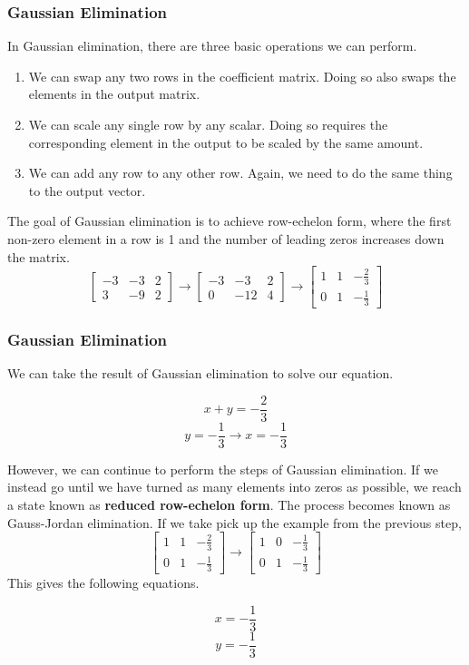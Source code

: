 \documentclass[10pt]{beamer}
\begin{document}
\begin{frame}
  \frametitle{Gaussian Elimination}
  In Gaussian elimination, there are three basic operations we can perform.
  \begin{enumerate}
  \item We can swap any two rows in the coefficient matrix. Doing so also swaps the elements in the output matrix.
  \item We can scale any single row by any scalar. Doing so requires the corresponding element in the output to be scaled by the same amount.
  \item We can add any row to any other row. Again, we need to do the same thing to the output vector.
  \end{enumerate}

  The goal of Gaussian elimination is to achieve row-echelon form, where the first non-zero element in a row is 1 and the number of leading zeros increases down the matrix.
  $$\left[\begin{array}{cc|c}
      -3 & -3 & 2\\
      3 & -9 & 2
    \end{array}\right] \rightarrow \left[\begin{array}{cc|c}
      -3 & -3 & 2\\
      0 & -12 & 4
    \end{array}\right] \rightarrow \left[\begin{array}{cc|c}
      1 & 1 & -\frac{2}{3}\\
      0 & 1 & -\frac{1}{3}
    \end{array}\right]$$
\end{frame}

\begin{frame}
  \frametitle{Gaussian Elimination}
  We can take the result of Gaussian elimination to solve our equation.

  $$x + y = -\frac{2}{3}$$
  $$y = -\frac{1}{3} \rightarrow x = -\frac{1}{3}$$

  However, we can continue to perform the steps of Gaussian elimination. If we instead go until we have turned as many elements into zeros as possible, we reach a state known as \textbf{reduced row-echelon form}. The process becomes known as Gauss-Jordan elimination. If we take pick up the example from the previous step,
  $$\left[\begin{array}{cc|c}
      1 & 1 & -\frac{2}{3}\\
      0 & 1 & -\frac{1}{3}
    \end{array}\right]\rightarrow\left[\begin{array}{cc|c}
      1 & 0 & -\frac{1}{3}\\
      0 & 1 & -\frac{1}{3}
    \end{array}\right]$$
  This gives the following equations.

  $$x = -\frac{1}{3}$$
  $$y = -\frac{1}{3}$$
\end{frame}
\end{document}
